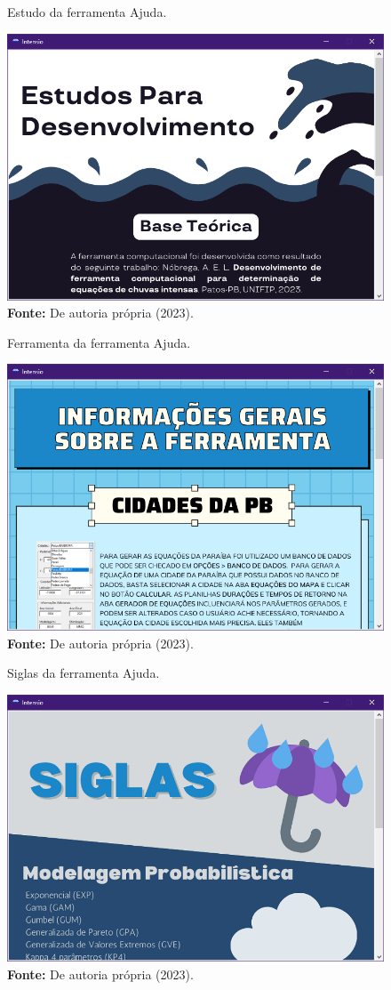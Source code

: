 \begin{figure}[!ht]
	\centering
	\caption{Estudo da ferramenta Ajuda.}
	\includegraphics[width=.7625\linewidth]{figuras/estudo.png}
	\caption*{\textbf{Fonte:} De autoria própria (2023).}
	\label{fig:figuras/estudo.png}
\end{figure}

\begin{figure}[!ht]
	\centering
	\caption{Ferramenta da ferramenta Ajuda.}
	\includegraphics[width=.7625\linewidth]{figuras/ferramenta.png}
	\caption*{\textbf{Fonte:} De autoria própria (2023).}
	\label{fig:figuras/ferramenta.png}
\end{figure}

\newpage

\begin{figure}[!ht]
	\centering
	\caption{Siglas da ferramenta Ajuda.}
	\includegraphics[width=.7625\linewidth]{figuras/siglas.png}
	\caption*{\textbf{Fonte:} De autoria própria (2023).}
	\label{fig:figuras/siglas.png}
\end{figure}

